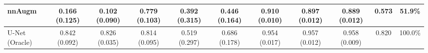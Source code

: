 \begin{table}
{\begin{tabular}{lcccccccccc}
			nnAugm \cite{nnunet} & 0.166 (0.125) & 0.102 (0.090) & \textbf{0.779 (0.103)} & 0.392 (0.315) & \textbf{0.446 (0.164)} & \textbf{0.910 (0.010)} & 0.897 (0.012) & 0.889 (0.012) & 0.573 & 51.9\% \\
			
			
			
			
			\midrule
			
			U-Net (Oracle)        & 0.842 (0.092) & 0.826 (0.035) & 0.814 (0.095) & 0.519 (0.297) & 0.686 (0.178) & 0.954 (0.017) & 0.957 (0.012) & 0.958 (0.009) & 0.820 & 100.0\% \\
			
			\bottomrule
			
	\end{tabular}}
	\label{tab:metrics_pure}
\end{table}


